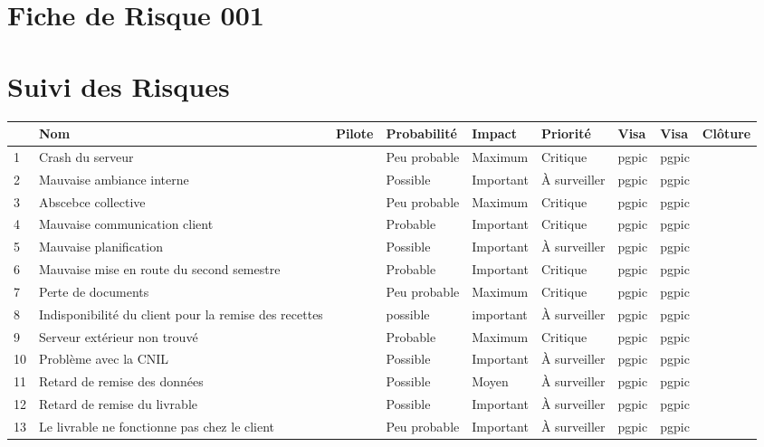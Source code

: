 \documentclass[asi]{picINSA}
\title{\PRO{}}
\author{\Pierre}
\begin{document}
\couverture{}

\informationsGenerales{}

 
\chapter*{Fiche de Risque 001}


\chapter*{Suivi des Risques}
\begin{longtable}{|p{0.3cm}|p{2.5cm}|p{2cm}|p{2cm}|p{1.8cm}|p{1.5cm}|p{1cm}|p{1cm}|p{1.5cm}|}
			\hline
			\rowcolor{gray!40}
			\No & Nom & Pilote & Probabilité & Impact & Priorité & Visa \RQCourt{} & Visa \CPCourt{} & Clôture \\\hline
			 1 & Crash du serveur & \Matthieu & Peu probable & Maximum & Critique & pgpic & pgpic & \\\hline
			 2 & Mauvaise ambiance interne & \Michel & Possible & Important & À surveiller & pgpic & pgpic & \\\hline
			 3 & Abscebce collective & \Pierre & Peu probable & Maximum & Critique & pgpic & pgpic & \\\hline
			 4 & Mauvaise communication client & \Julie & Probable & Important & Critique & pgpic & pgpic & \\\hline
			 5 & Mauvaise planification & \Florian & Possible & Important & À surveiller & pgpic & pgpic & \\\hline
			 6 & Mauvaise mise en route du second semestre & \Melissa & Probable & Important & Critique & pgpic & pgpic & \\\hline
			 7 & Perte de documents & \Mathieu & Peu probable & Maximum & Critique & pgpic & pgpic & \\\hline
			 8 & Indisponibilité du client pour la remise des recettes & \Julie & possible & important & À surveiller & pgpic & pgpic & \\\hline
			 9 & Serveur extérieur non trouvé & \Matthieu & Probable & Maximum & Critique & pgpic & pgpic & \\\hline
			 10 & Problème avec la CNIL & \Pierre & Possible & Important & À surveiller & pgpic & pgpic & \\\hline
			 11 & Retard de remise des données & \Sergi & Possible & Moyen & À surveiller & pgpic & pgpic & \\\hline
			 12 & Retard de remise du livrable & \Kafui & Possible & Important & À surveiller & pgpic & pgpic & \\\hline
			 13 & Le livrable ne fonctionne pas chez le client & \Melissa & Peu probable & Important & À surveiller & pgpic & pgpic & \\\hline
\end{longtable}
\end{document}
